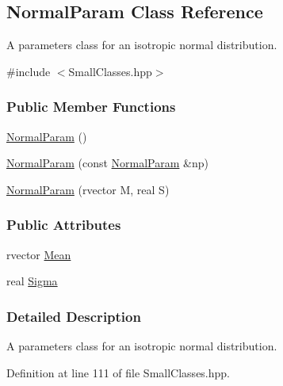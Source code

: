 \hypertarget{classNormalParam}{\subsection{\-Normal\-Param \-Class \-Reference}
\label{classNormalParam}
}


\-A parameters class for an isotropic normal distribution.  




{\ttfamily \#include $<$\-Small\-Classes.\-hpp$>$}

\subsubsection*{\-Public \-Member \-Functions}
\begin{DoxyCompactItemize}
\item 
\hyperlink{classNormalParam_a8f60cfaeb0658b177a776ea186e56484}{\-Normal\-Param} ()
\item 
\hyperlink{classNormalParam_a817ec325de646ceafcd43d2090dd94fc}{\-Normal\-Param} (const \hyperlink{classNormalParam}{\-Normal\-Param} \&np)
\item 
\hyperlink{classNormalParam_aac875191462b1b9784c1a2d86baed1c9}{\-Normal\-Param} (rvector \-M, real \-S)
\end{DoxyCompactItemize}
\subsubsection*{\-Public \-Attributes}
\begin{DoxyCompactItemize}
\item 
rvector \hyperlink{classNormalParam_ad54ec401e0de60337f44f4101875d9e1}{\-Mean}
\item 
real \hyperlink{classNormalParam_a187da2672eb7dcd5d9916eb751aad0ea}{\-Sigma}
\end{DoxyCompactItemize}


\subsubsection{\-Detailed \-Description}
\-A parameters class for an isotropic normal distribution. 

\-Definition at line 111 of file \-Small\-Classes.\-hpp.



